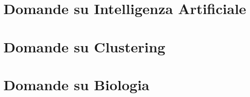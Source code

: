 \chapter{Domande su Intelligenza Artificiale}


\chapter{Domande su Clustering}


\chapter{Domande su Biologia}




